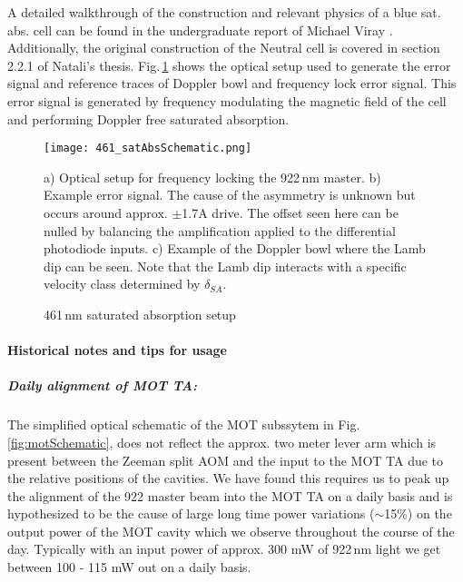 A detailed walkthrough of the construction and relevant physics of a blue sat. abs. cell can be found in the undergraduate report of Michael Viray \cite{MichaelViray2014}.
Additionally, the original construction of the Neutral cell is covered in section 2.2.1 of Natali's thesis.
Fig.\,\ref{fig:blueSatAbs} shows the optical setup used to generate the error signal and reference traces of Doppler bowl and frequency lock error signal.
This error signal is generated by frequency modulating the magnetic field of the cell and performing Doppler free saturated absorption.
	\begin{figure} 
		\centerline{
		\texttt{[image: 461\_satAbsSchematic.png]}}
		\caption{461\,nm saturated absorption setup}{a) Optical setup for frequency locking the 922\,nm master. b) Example error signal. The cause of the asymmetry is unknown but occurs around approx. $\pm$1.7A drive. The offset seen here can be nulled by balancing the amplification applied to the differential photodiode inputs. c) Example of the Doppler bowl where the Lamb dip can be seen. Note that the Lamb dip interacts with a specific velocity class determined by $\delta_{SA}$.}
		\label{fig:blueSatAbs}
	\end{figure}

\paragraph{Historical notes and tips for usage}
\subparagraph{Daily alignment of MOT TA:}
The simplified optical schematic of the MOT subssytem in Fig.\,\ref{fig:motSchematic}, does not reflect the approx. two meter lever arm which is present between the Zeeman split AOM and the input to the MOT TA due to the relative positions of the cavities.
We have found this requires us to peak up the alignment of the 922 master beam into the MOT TA on a daily basis and is hypothesized to be the cause of large long time power variations ($\sim$15\%) on the output power of the MOT cavity which we observe throughout the course of the day.
Typically with an input power of approx. 300 mW of 922\,nm light we get between 100 - 115 mW out on a daily basis.

